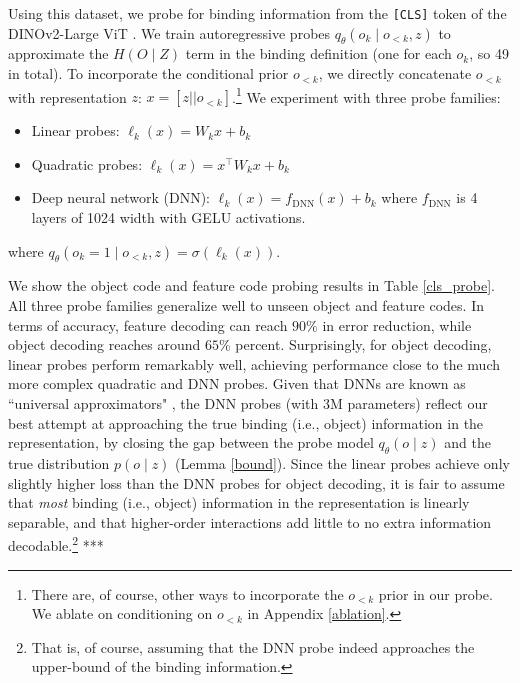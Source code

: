 \documentclass{article}
\theoremstyle{plain}
\theoremstyle{definition}
\theoremstyle{remark}
\begin{document}
Using this dataset, we probe for binding information from the \texttt{[CLS]} token of the DINOv2-Large ViT \cite{oquab2024dinov2learningrobustvisual}. We train autoregressive probes $q_\theta(o_k\mid o_{<k}, z)$ to approximate the $H(O\mid Z)$ term in the binding definition (one for each $o_k$, so 49 in total). To incorporate the conditional prior $o_{<k}$, we directly concatenate $o_{<k}$ with representation $z$: $x=[z || o_{<k}]$.\footnote{There are, of course, other ways to incorporate the $o_{<k}$ prior in our probe. We ablate on conditioning on $o_{<k}$ in Appendix \ref{ablation}.} We experiment with three probe families:
\begin{itemize}
    \item Linear probes: $\ell_k(x)=W_kx+b_k$
    \item Quadratic probes: $\ell_k(x)=x^\top W_kx+b_k$
    \item Deep neural network (DNN): $\ell_k(x)=f_{\mathrm{DNN}}(x)+b_k$ where $f_{\mathrm{DNN}}$ is 4 layers of 1024 width with GELU activations.
\end{itemize}
where $
q_\theta(o_k=1 \mid o_{<k}, z)
=
\sigma(\ell_k(x)).$

We show the object code and feature code probing results in Table \ref{cls_probe}. All three probe families generalize well to unseen object and feature codes. In terms of accuracy, feature decoding can reach $90\%$ in error reduction, while object decoding reaches around $65\%$ percent. Surprisingly, for object decoding, linear probes perform remarkably well, achieving performance close to the much more complex quadratic and DNN probes. Given that DNNs are known as ``universal approximators" \cite{HORNIK1989359}, the DNN probes (with 3M parameters) reflect our best attempt at approaching the true binding (i.e., object) information in the representation, by closing the gap between the probe model $q_{\theta}(o\mid z)$ and the true distribution $p(o\mid z)$ (Lemma \ref{bound}). Since the linear probes achieve only slightly higher loss than the DNN probes for object decoding, it is fair to assume that \textit{most} binding (i.e., object) information in the representation is linearly separable, and that higher-order interactions add little to no extra information decodable.\footnote{That is, of course, assuming that the DNN probe indeed approaches the upper-bound of the binding information.}
***
\end{document}
